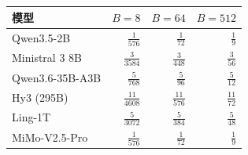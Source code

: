 \begin{tabular}{@{}lrrr@{}}\toprule
模型 & $B=8$ & $B=64$ & $B=512$\\\midrule
Qwen3.5-2B & $\frac{1}{576}$ & $\frac{1}{72}$ & $\frac{1}{9}$\\[3pt]
Ministral 3 8B & $\frac{3}{3584}$ & $\frac{3}{448}$ & $\frac{3}{56}$\\[3pt]
Qwen3.6-35B-A3B & $\frac{5}{768}$ & $\frac{5}{96}$ & $\frac{5}{12}$\\[3pt]
Hy3 (295B) & $\frac{11}{4608}$ & $\frac{11}{576}$ & $\frac{11}{72}$\\[3pt]
Ling-1T & $\frac{5}{3072}$ & $\frac{5}{384}$ & $\frac{5}{48}$\\[3pt]
MiMo-V2.5-Pro & $\frac{1}{576}$ & $\frac{1}{72}$ & $\frac{1}{9}$\\[3pt]
\bottomrule\end{tabular}
